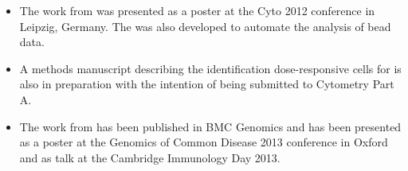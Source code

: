 \begin{publications}

\begin{itemize}
 \item
   The work from  was presented as a poster at the Cyto 2012 conference in Leipzig, Germany.
   The  was also developed to automate the analysis of bead data.
 \item
   A methods manuscript describing the identification dose-responsive cells for  is also in preparation with the intention of being submitted to Cytometry Part A.
 \item
   The work from  has been published in BMC Genomics \citep{Pontikos:2014ho} and has been presented as a poster
   at the Genomics of Common Disease 2013 conference in Oxford and as talk at the Cambridge Immunology Day 2013.
\end{itemize}

\end{publications}

